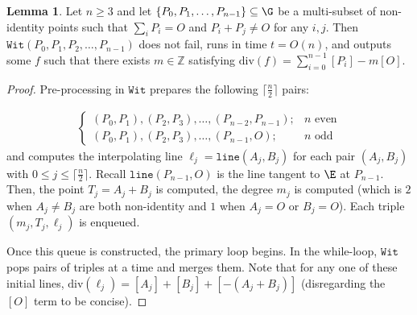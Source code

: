 \documentclass[11pt,letterpaper]{article}
\theoremstyle{definition}
\newtheorem{lemm}[theorem]{Lemma}
\newcommand{\6}{\mathbf}
\newcommand{\7}{\mathcal}
\begin{document}
\begin{lemm}
\label{lem:witnessCorrectness}
Let $n \geq 3$ and let $\left\{P_0, P_1, \ldots, P_{n-1}\right\} \subseteq \G$ be a multi-subset of non-identity points such that $\sum_i P_i = O$ and $P_i + P_j \neq O$ for any $i,j$. Then $\texttt{Wit}(P_0, P_1, P_2, \ldots, P_{n-1})$ does not fail, runs in time $t = O(n)$, and outputs some $f$ such that there exists $m \in \mathbb{Z}$ satisfying $\text{div}(f) = \sum_{i=0}^{n-1} [P_i] - m[O]$. 
\end{lemm}
\begin{proof}
Pre-processing in $\texttt{Wit}$ prepares the following $\lceil \frac{n}{2}\rceil$ pairs:

\begin{align}
\begin{cases}
(P_0, P_1), (P_2, P_3), \ldots, (P_{n-2}, P_{n-1});& n \text{ even} \\
 (P_0, P_1), (P_2, P_3), \ldots, (P_{n-1}, O);& n \text{ odd} 
 \end{cases}
\end{align}
and computes the interpolating line $\ell_j = \texttt{line}(A_j,B_j)$ for each pair $(A_j, B_j)$ with $0 \leq j \leq \lceil \frac{n}{2}\rceil$. Recall $\texttt{line}(P_{n-1},O)$ is the line tangent to $\E$ at $P_{n-1}$. 
Then, the point $T_j = A_j + B_j$ is computed, the degree $m_j$ is computed (which is $2$ when $A_j \neq B_j$ are both non-identity and $1$ when $A_j = O$ or $B_j = O$). Each triple $(m_j, T_j, \ell_j)$ is enqueued. 

Once this queue is constructed, the primary loop begins.
In the while-loop, $\texttt{Wit}$ pops pairs of triples at a time and merges them.  Note that for any one of these initial lines, $\text{div}(\ell_j) = [A_j] + [B_j] + [-(A_j+B_j)]$ (disregarding the $[O]$ term to be concise). 


\end{proof}
\end{document}

